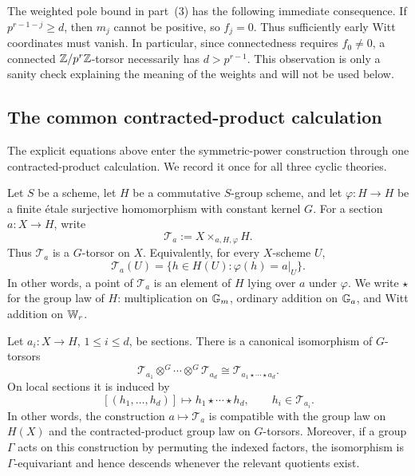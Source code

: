 \begin{rem*}\label{rem:realization_Wr_sanity}
The weighted pole bound in part~(3) has the following immediate consequence.
If $p^{r-1-j}\geq d$, then $m_j$ cannot be positive, so $f_j=0$. Thus
sufficiently early Witt coordinates must vanish. In particular, since
connectedness requires $f_0\neq0$, a connected $\mathbb{Z}/p^r\mathbb{Z}$-torsor necessarily
has $d>p^{r-1}$. This observation is only a sanity check explaining the
meaning of the weights and will not be used below.
\end{rem*}

\subsection*{The common contracted-product calculation}

The explicit equations above enter the symmetric-power construction through
one contracted-product calculation. We record it once for all three cyclic
theories.

Let $S$ be a scheme, let $H$ be a commutative $S$-group scheme, and let
$\varphi:H\to H$ be a finite \'etale surjective homomorphism with constant
kernel $G$. For a section $a:X\to H$, write
\[
    \mathcal T_a:=X\times_{a,H,\varphi}H.
\]
Thus $\mathcal T_a$ is a $G$-torsor on $X$. Equivalently, for every
$X$-scheme $U$,
\[
    \mathcal T_a(U)=
    \{h\in H(U):\varphi(h)=a|_U\}.
\]
In other words, a point of $\mathcal T_a$ is an element of $H$ lying over
$a$ under $\varphi$. We write $\star$ for the group law of $H$:
multiplication on $\mathbb{G}_m$, ordinary addition on $\mathbb{G}_a$, and Witt addition
on $\mathbb{W}_r$.

\begin{prop}
\label{prop:parallel_cyclic_product_torsor}
Let $a_i:X\to H$, $1\leq i\leq d$, be sections. There is a canonical
isomorphism of $G$-torsors
\[
    \mathcal T_{a_1}\otimes^G\cdots\otimes^G\mathcal T_{a_d}
       \cong \mathcal T_{a_1\star\cdots\star a_d}.
\]
On local sections it is induced by
\[
    [(h_1,\dots,h_d)]\longmapsto
    h_1\star\cdots\star h_d,
    \qquad h_i\in\mathcal T_{a_i}.
\]
In other words, the construction $a\mapsto\mathcal T_a$ is compatible with
the group law on $H(X)$ and the contracted-product group law on $G$-torsors.
Moreover, if a group $\Gamma$ acts on this construction by permuting the
indexed factors, the isomorphism is $\Gamma$-equivariant and hence descends
whenever the relevant quotients exist.
\end{prop}

